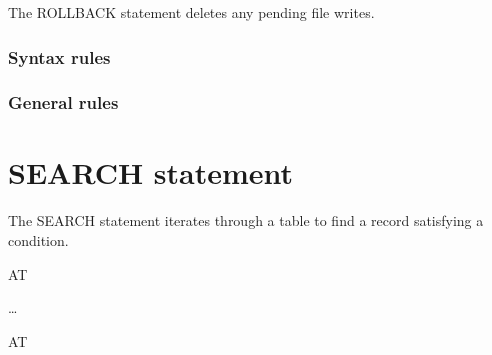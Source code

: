 The ROLLBACK statement deletes any pending file writes.

\begin{syntax}[\miscextcolour]
\end{syntax}

\subsubsection{Syntax rules}

\subsubsection{General rules}

\section{SEARCH statement}

The SEARCH statement iterates through a table to find a record satisfying a condition.

\begin{syntax}
   \identifier
  \begin{0-1}
     \identifier
  \end{0-1}

  \begin{0-1}
    AT  \imperativestatement
  \end{0-1}

  \begin{1=}
     \condition \imperativestatement
  \end{1=} \ldots

  \begin{0-1}
  \end{0-1}
\end{syntax}

\begin{syntax}
    \identifier

  \begin{0-1}
    AT  \imperativestatement
  \end{0-1}

   \expression \imperativestatement

  \begin{0-1}
  \end{0-1}
\end{syntax}

